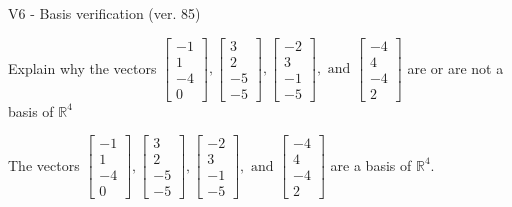 \begin{exercise}
  \begin{exerciseTitle}V6 - Basis verification (ver. 85)\end{exerciseTitle}
  \begin{exerciseStatement}
    Explain why the vectors \(\left[\begin{array}{r}
-1 \\
1 \\
-4 \\
0
\end{array}\right] , \left[\begin{array}{r}
3 \\
2 \\
-5 \\
-5
\end{array}\right] , \left[\begin{array}{r}
-2 \\
3 \\
-1 \\
-5
\end{array}\right] , \text{ and } \left[\begin{array}{r}
-4 \\
4 \\
-4 \\
2
\end{array}\right]\) are or are not a basis of \(\mathbb{R}^4\)	


  \end{exerciseStatement}
  \begin{exerciseAnswer}
   The vectors \(\left[\begin{array}{r}
-1 \\
1 \\
-4 \\
0
\end{array}\right] , \left[\begin{array}{r}
3 \\
2 \\
-5 \\
-5
\end{array}\right] , \left[\begin{array}{r}
-2 \\
3 \\
-1 \\
-5
\end{array}\right] , \text{ and } \left[\begin{array}{r}
-4 \\
4 \\
-4 \\
2
\end{array}\right]\) 
  	 are  a basis of \(\mathbb{R}^4\).
  


  \end{exerciseAnswer}
\end{exercise}